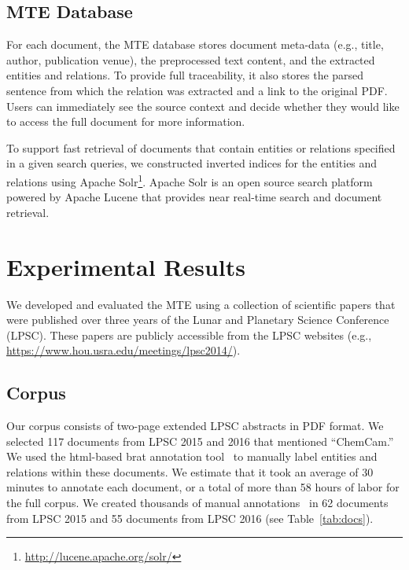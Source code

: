 \documentclass[letterpaper]{article} %
\begin{document}

\subsection{MTE Database}

For each document, the MTE database stores document meta-data (e.g.,
title, author, publication venue), the preprocessed text content, and
the extracted entities and relations.  To provide full traceability,
it also stores the parsed sentence from which the relation was
extracted and a link to the original PDF.  Users can immediately see
the source context and decide whether they would like to access the
full document for more information.
 
To support fast retrieval of
documents that contain entities or relations specified in a given
search queries, we constructed inverted indices for the entities and
relations using Apache
Solr\footnote{\url{http://lucene.apache.org/solr/}}. Apache Solr is an
open source search platform powered by Apache Lucene that provides
near real-time search and document retrieval. 
 
\section{Experimental Results}

We developed and evaluated the MTE using a collection of scientific
papers that were published over three years of the Lunar and Planetary
Science Conference (LPSC).  These papers are publicly accessible from
the LPSC websites
(e.g., \url{https://www.hou.usra.edu/meetings/lpsc2014/}). 

\subsection{Corpus}

Our corpus consists of two-page extended LPSC abstracts in PDF format.
We selected 117 documents from LPSC 2015 and 2016 that mentioned
``ChemCam.''  We used the html-based brat annotation tool~\cite{brat}
to manually label entities and relations within these documents.  We
estimate that it took an average of 30 minutes to annotate each
document, or a total of more than 58 hours of labor for the full
corpus.  We created thousands of manual
annotations~\cite{francis:mte-data} in 62 documents from LPSC 2015 and
55 documents from LPSC 2016 (see Table~\ref{tab:docs}).
\end{document}
